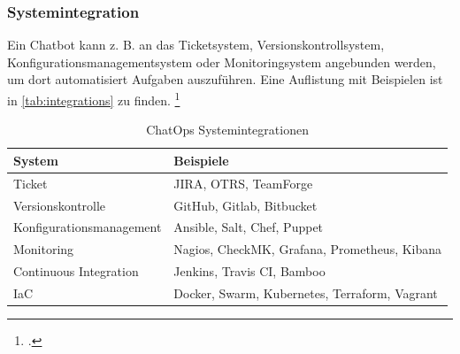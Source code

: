 
\subsubsection{Systemintegration}
Ein Chatbot kann z. B. an das Ticketsystem, Versionskontrollsystem, Konfigurationsmanagementsystem oder Monitoringsystem angebunden werden, um dort automatisiert Aufgaben auszuführen. Eine Auflistung mit Beispielen ist in \autoref{tab:integrations} zu finden.
\footcite[Vgl.][o. \pno]{Zyane_2017_ChatOps}

\begin{table}[H]
\centering
\begin{tabularx}{.8\textwidth}{l|X}
  System & Beispiele \\\hline
  Ticket& JIRA, OTRS, TeamForge \\
  Versionskontrolle & GitHub, Gitlab, Bitbucket\\
  Konfigurationsmanagement & Ansible, Salt, Chef, Puppet\\
  Monitoring & Nagios, CheckMK, Grafana, Prometheus, Kibana\\
  Continuous Integration & Jenkins, Travis CI, Bamboo\\
  \acf{IaC} & Docker, Swarm, Kubernetes, Terraform, Vagrant\\
\end{tabularx}
\caption{ChatOps Systemintegrationen}
\label{tab:integrations}
\end{table}

